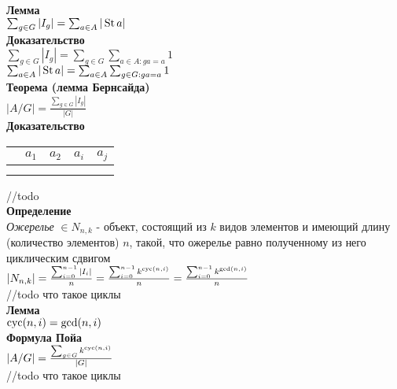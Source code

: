 \documentclass[12pt]{article}
\begin{document}
\textbf{Лемма}\\
$\sum_{g\in G} |I_g| = \sum_{a \in A} |\operatorname{St} a|$\\
\textbf{Доказательство}\\
$\sum_{g\in G} |I_g| = \sum_{g \in G} \sum_{a \in A: ga = a} 1$\\
$\sum_{a \in A} |\operatorname{St} a| = \sum_{a \in A} \sum_{g \in G: ga = a} 1$\\
\textbf{Теорема (лемма Бернсайда)}\\
$|A/G| = \frac{\sum_{g\in G} |I_g|}{|G|}$\\
\textbf{Доказательство}\\
\begin{tabular}{c|c c c c}
    & $a_1$ & $a_2$ & $a_i$ & $a_j$\\
    \hline
    &  \\
    & 
\end{tabular}
//todo\\
\textbf{Определение}\\
\textit{Ожерелье} $\in N_{n,k}$ - объект, состоящий из $k$ видов элементов и имеющий длину (количество элементов) $n$, такой, что ожерелье равно полученному из него циклическим сдвигом\\
$|N_{n,k}| = \frac{\sum_{i = 0}^{n-1} |I_i|}{n} = \frac{\sum_{i = 0}^{n-1} k^{\operatorname{cyc}(n,i)}}{n} = \frac{\sum_{i = 0}^{n-1} k^{\operatorname{gcd}(n,i)}}{n}$\\
//todo что такое циклы\\
\textbf{Лемма}\\
$\operatorname{cyc}(n,i) = \operatorname{gcd}(n,i)$\\
\textbf{Формула Пойа}\\
$|A/G| = \frac{\sum_{g \in G} k^{\operatorname{cyc}(n,i)}}{|G|}$\\
//todo что такое циклы\\
\end{document}
